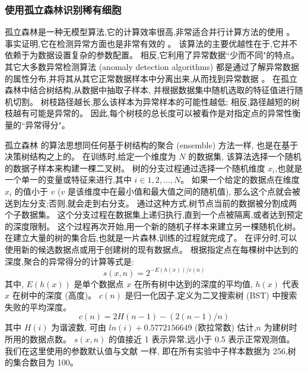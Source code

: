\subsubsection{使用孤立森林识别稀有细胞}
\label{subsec:if} 

孤立森林是一种无模型算法,它的计算效率很高,非常适合并行计算方法的使用 \cite{hariri2018batch}。
事实证明,它在检测异常方面也是非常有效的 \cite{susto2017anomaly}。
该算法的主要优越性在于,它并不依赖于为数据设置复杂的参数配置。
相反,它利用了异常数据``少而不同"的特点。
其它大多数异常检测算法 (anomaly detection algorithms) 都是通过了解异常数据的属性分布,并将其从其它正常数据样本中分离出来,从而找到异常数据 \cite{noto2010anomaly,chen2011ordinal,das2016incorporating}。
在孤立森林中结合树结构,从数据中抽取子样本,
并根据数据集中随机选取的特征值进行随机切割。
树枝路径越长,那么该样本为异常样本的可能性越低;
相反,路径越短的树枝越有可能是异常的。
因此,每个树枝的总长度可以被看作是对指定点的异常性衡量的``异常得分"。

孤立森林 \cite{liu2008isolation,liu2012isolation} 的算法思想同任何基于树结构的聚合 (ensemble) 方法一样,
也是在基于决策树结构之上的。
在训练时,给定一个维度为 $N$ 的数据集,
该算法选择一个随机的数据子样本来构建一棵二叉树。
树的分支过程通过选择一个随机维度 $x_i$,也就是一个单一的变量或特征来进行,其中 $i \in {1,2,\ldots,N}$。
如果一个给定的数据点在维度 $x_i$ 的值小于 $v$ ($v$ 是该维度中在最小值和最大值之间的随机值),
那么这个点就会被送到左分支;否则,就会走到右分支。
通过这种方式,树节点当前的数据被分割成两个子数据集。
这个分支过程在数据集上递归执行,直到一个点被隔离,或者达到预定的深度限制。
这个过程再次开始,用一个新的随机子样本来建立另一棵随机化树。
在建立大量的树的集合后,也就是一片森林,训练的过程就完成了。
在评分时,可以使用新的候选数据点或用于创建树的现有数据点。
根据指定点在每棵树中达到的深度,聚合的异常得分的计算等式是:
\begin{equation}
    \label{as}
    s(x,n) = 2^{-E(h(x))/c(n)}
\end{equation}
其中, $E(h(x))$ 是单个数据点 $x$ 在所有树中达到的深度的平均值, $h(x)$ 代表 $x$ 在树中的深度 (高度)。 
$c(n)$ 是归一化因子,定义为二叉搜索树 (BST) 中搜索失败的平均深度。
\begin{equation}
    \label{lab:as}
    c(n) = 2H(n - 1) - (2(n - 1)/n)
\end{equation}
其中 $H(i)$ 为谐波数,
可由 $ln(i) + 0.5772156649$ (欧拉常数) \cite{liu2012isolation}估计,$n$ 为建树时所用的数据点数。
$s(x,n)$ 的值接近 1 表示异常,远小于 0.5 表示正常观测值。
我们在这里使用的参数默认值与文献 \cite{liu2008isolation,liu2012isolation}一样,
即在所有实验中子样本数据为 256,树的集合数目为 100。

